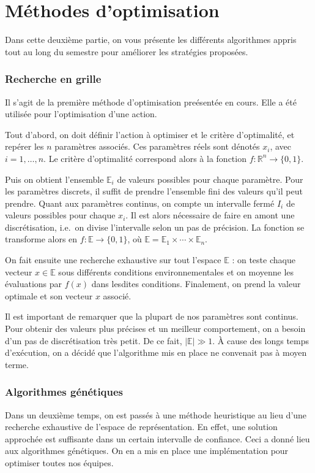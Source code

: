 \documentclass[12pt,a4paper]{article}
\begin{document}
\newpage

\part{M\'ethodes d'optimisation}
Dans cette deuxi\`eme partie, on vous pr\'esente les diff\'erents 
algorithmes appris tout au long du semestre pour am\'eliorer 
les strat\'egies propos\'ees.

\section{Recherche en grille}
Il s'agit de la premi\`ere m\'ethode d'optimisation pre\'esent\'ee en cours. 
Elle a \'et\'e utilis\'ee pour l'optimisation d'une action.

Tout d'abord, on doit d\'efinir l'action \`a optimiser et le crit\`ere 
d'optimalit\'e, et rep\'erer les $n$ param\`etres associ\'es. Ces param\`etres 
r\'eels sont d\'enot\'es $x_i$, avec $i=1,\dotsc,n$. Le crit\`ere 
d'optimalit\'e correspond alors \`a la fonction $f: \mathbb{R}^n \to \{0,1\}$.

Puis on obtient l'ensemble $\mathbb{E}_i$ de valeurs possibles pour chaque 
param\`etre. 
Pour les param\`etres discrets, il suffit de prendre l'ensemble 
fini des valeurs qu'il peut prendre. 
Quant aux param\`etres continus, on compte un intervalle ferm\'e $I_i$ de 
valeurs possibles pour chaque $x_i$. Il est alors n\'ecessaire de faire en 
amont une discr\'etisation, i.e.\ on divise l'intervalle selon un pas de 
pr\'ecision. La fonction se transforme alors en $f: \mathbb{E} \to \{0,1\}$, 
o\`u $\mathbb{E} =  \mathbb{E}_1 \times \cdots \times \mathbb{E}_n$.

On fait ensuite une recherche exhaustive sur tout l'espace $\mathbb{E}$ : 
on teste chaque vecteur $x \in \mathbb{E}$ sous diff\'erents conditions 
environnementales et on moyenne les \'evaluations par $f(x)$ dans lesdites 
conditions. Finalement, on prend la valeur optimale et son vecteur $x$ 
associ\'e.

Il est important de remarquer que la plupart de nos param\`etres sont continus. 
Pour obtenir des valeurs plus pr\'ecises et un meilleur comportement, on a 
besoin d'un pas de discr\'etisation tr\`es petit. De ce fait, 
$|\mathbb{E}| \gg 1$. \`A cause des longs temps d'ex\'ecution, on a 
d\'ecid\'e que l'algorithme mis en place ne convenait pas \`a moyen terme.

\section{Algorithmes g\'en\'etiques}
Dans un deuxi\`eme temps, on est pass\'es \`a une m\'ethode heuristique au 
lieu d'une recherche exhaustive de l'espace de repr\'esentation. En effet, 
une solution approch\'ee est suffisante dans un certain intervalle de 
confiance. Ceci a donn\'e lieu aux algorithmes g\'en\'etiques. On en a mis en 
place une impl\'ementation pour optimiser toutes nos \'equipes.
\end{document}
